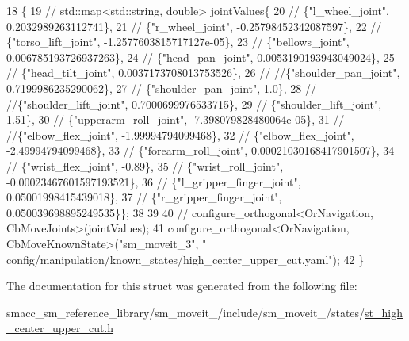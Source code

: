 \begin{DoxyCode}
18     \{
19         \textcolor{comment}{// std::map<std::string, double> jointValues\{}
20         \textcolor{comment}{//     \{"l\_wheel\_joint", 0.2032989263112741\},}
21         \textcolor{comment}{//     \{"r\_wheel\_joint", -0.25798452342087597\},}
22         \textcolor{comment}{//     \{"torso\_lift\_joint", -1.2577603815717127e-05\},}
23         \textcolor{comment}{//     \{"bellows\_joint", 0.006785193726937263\},}
24         \textcolor{comment}{//     \{"head\_pan\_joint", 0.0053190193943049024\},}
25         \textcolor{comment}{//     \{"head\_tilt\_joint", 0.0037173708013753526\},}
26         \textcolor{comment}{//     //\{"shoulder\_pan\_joint", 0.7199986235290062\},}
27         \textcolor{comment}{//     \{"shoulder\_pan\_joint", 1.0\},}
28         \textcolor{comment}{//     //\{"shoulder\_lift\_joint", 0.7000699976533715\},}
29         \textcolor{comment}{//     \{"shoulder\_lift\_joint", 1.51\},}
30         \textcolor{comment}{//     \{"upperarm\_roll\_joint", -7.398079828480064e-05\},}
31         \textcolor{comment}{//     //\{"elbow\_flex\_joint", -1.99994794099468\},}
32         \textcolor{comment}{//     \{"elbow\_flex\_joint", -2.49994794099468\},}
33         \textcolor{comment}{//     \{"forearm\_roll\_joint", 0.00021030168417901507\},}
34         \textcolor{comment}{//     \{"wrist\_flex\_joint", -0.89\},}
35         \textcolor{comment}{//     \{"wrist\_roll\_joint", -0.00023467601597193521\},}
36         \textcolor{comment}{//     \{"l\_gripper\_finger\_joint", 0.05001998415439018\},}
37         \textcolor{comment}{//     \{"r\_gripper\_finger\_joint", 0.050039698895249535\}\};}
38 
39 
40 \textcolor{comment}{//        configure\_orthogonal<OrNavigation, CbMoveJoints>(jointValues);}
41         configure\_orthogonal<OrNavigation, CbMoveKnownState>(\textcolor{stringliteral}{"sm\_moveit\_3"}, \textcolor{stringliteral}{"
      config/manipulation/known\_states/high\_center\_upper\_cut.yaml"});
42     \}
\end{DoxyCode}


The documentation for this struct was generated from the following file\+:\begin{DoxyCompactItemize}
\item 
smacc\+\_\+sm\+\_\+reference\+\_\+library/sm\+\_\+moveit\+\_/include/sm\+\_\+moveit\+\_/states/\hyperlink{st__high__center__upper__cut_8h}{st\+\_\+high\+\_\+center\+\_\+upper\+\_\+cut.\+h}\end{DoxyCompactItemize}
